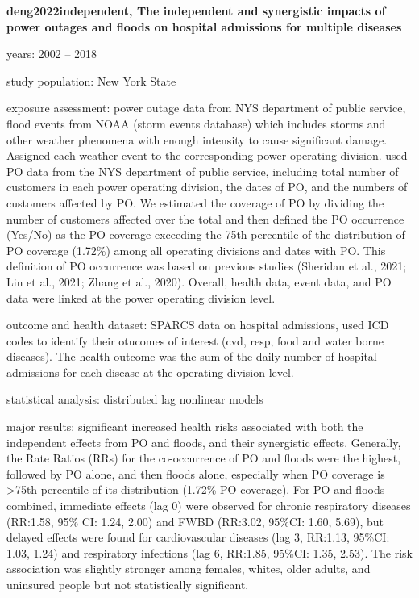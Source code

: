 \textbf{deng2022independent, The independent and synergistic impacts of power outages and floods on hospital admissions for multiple diseases}
    \item years: 2002 -- 2018
    \item study population: New York State
    \item exposure assessment: power outage data from NYS department of public service, flood events from NOAA (storm events database) which includes storms and other weather phenomena with enough intensity to cause significant damage. Assigned each weather event to the corresponding power-operating division. used PO data from the NYS department of public service, including total number of customers in each power operating division, the dates of PO, and the numbers of customers affected by PO. We estimated the coverage of PO by dividing the number of customers affected over the total and then defined the PO occurrence (Yes/No) as the PO coverage exceeding the 75th percentile of the distribution of PO coverage (1.72\%) among all operating divisions and dates with PO. This definition of PO occurrence was based on previous studies (Sheridan et al., 2021; Lin et al., 2021; Zhang et al., 2020). Overall, health data, event data, and PO data were linked at the power operating division level.
    \item outcome and health dataset: SPARCS data on hospital admissions, used ICD codes to identify their otucomes of interest (cvd, resp, food and water borne diseases). The health outcome was the sum of the daily number of hospital admissions for each disease at the operating division level.
    \item statistical analysis: distributed lag nonlinear models
    \item major results: significant increased health risks associated with both the independent effects from PO and floods, and their synergistic effects. Generally, the Rate Ratios (RRs) for the co-occurrence of PO and floods were the highest, followed by PO alone, and then floods alone, especially when PO coverage is >75th percentile of its distribution (1.72\% PO coverage). For PO and floods combined, immediate effects (lag 0) were observed for chronic respiratory diseases (RR:1.58, 95\% CI: 1.24, 2.00) and FWBD (RR:3.02, 95\%CI: 1.60, 5.69), but delayed effects were found for cardiovascular diseases (lag 3, RR:1.13, 95\%CI: 1.03, 1.24) and respiratory infections (lag 6, RR:1.85, 95\%CI: 1.35, 2.53). The risk association was slightly stronger among females, whites, older adults, and uninsured people but not statistically significant.

